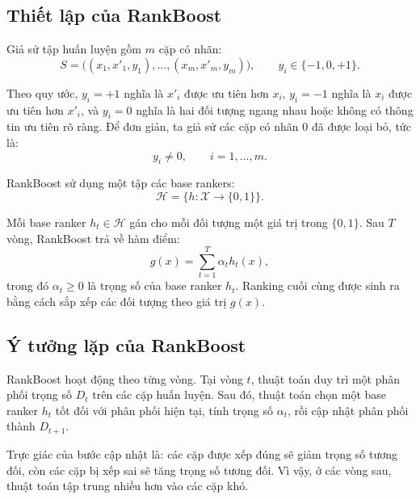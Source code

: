 \subsection{Thiết lập của RankBoost}

Giả sử tập huấn luyện gồm \(m\) cặp có nhãn:
\[
    S =
    \big((x_1,x'_1,y_1),\ldots,(x_m,x'_m,y_m)\big),
    \qquad
    y_i\in\{-1,0,+1\}.
\]

Theo quy ước, \(y_i=+1\) nghĩa là \(x'_i\) được ưu tiên hơn \(x_i\), \(y_i=-1\) nghĩa là \(x_i\) được ưu tiên hơn \(x'_i\), và \(y_i=0\) nghĩa là hai đối tượng ngang nhau hoặc không có thông tin ưu tiên rõ ràng. Để đơn giản, ta giả sử các cặp có nhãn \(0\) đã được loại bỏ, tức là:
\[
    y_i\neq 0,
    \qquad i=1,\ldots,m.
\]

RankBoost sử dụng một tập các base rankers:
\[
    \mathcal{H}
    =
    \{h:\mathcal{X}\rightarrow\{0,1\}\}.
\]

Mỗi base ranker \(h_t\in\mathcal{H}\) gán cho mỗi đối tượng một giá trị trong \(\{0,1\}\). Sau \(T\) vòng, RankBoost trả về hàm điểm:
\begin{equation}
    g(x)
    =
    \sum_{t=1}^{T}
    \alpha_t h_t(x),
    \label{eq:section5-final-ranker}
\end{equation}
trong đó \(\alpha_t\geq 0\) là trọng số của base ranker \(h_t\). Ranking cuối cùng được sinh ra bằng cách sắp xếp các đối tượng theo giá trị \(g(x)\).

\subsection{Ý tưởng lặp của RankBoost}

RankBoost hoạt động theo từng vòng. Tại vòng \(t\), thuật toán duy trì một phân phối trọng số \(D_t\) trên các cặp huấn luyện. Sau đó, thuật toán chọn một base ranker \(h_t\) tốt đối với phân phối hiện tại, tính trọng số \(\alpha_t\), rồi cập nhật phân phối thành \(D_{t+1}\).

Trực giác của bước cập nhật là: các cặp được xếp đúng sẽ giảm trọng số tương đối, còn các cặp bị xếp sai sẽ tăng trọng số tương đối. Vì vậy, ở các vòng sau, thuật toán tập trung nhiều hơn vào các cặp khó.


